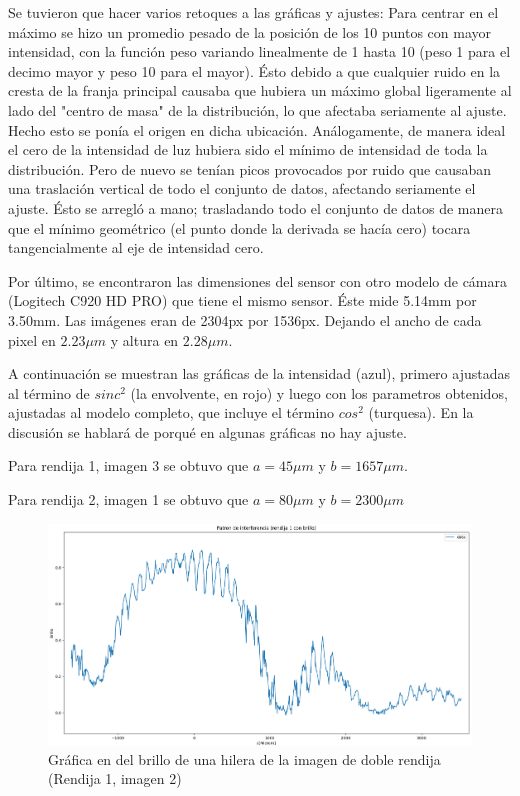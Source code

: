 \documentclass[12p]{article}
\begin{document}
Se tuvieron que hacer varios retoques a las gráficas y ajustes: Para centrar en el máximo se hizo un promedio pesado de la posición de los 10 puntos con mayor intensidad, con la función peso variando linealmente de 1 hasta 10 (peso 1 para el decimo mayor y peso 10 para el mayor). Ésto debido a que cualquier ruido en la cresta de la franja principal causaba que hubiera un máximo global ligeramente al lado del "centro de masa" de la distribución, lo que afectaba seriamente al ajuste. Hecho esto se ponía el origen en dicha ubicación. Análogamente, de manera ideal el cero de la intensidad de luz hubiera sido el mínimo de intensidad de toda la distribución. Pero de nuevo se tenían picos provocados por ruido que causaban una traslación vertical de todo el conjunto de datos, afectando seriamente el ajuste. Ésto se arregló a mano; trasladando todo el conjunto de datos de manera que el mínimo geométrico (el punto donde la derivada se hacía cero) tocara tangencialmente al eje de intensidad cero.

Por último, se encontraron las dimensiones del sensor con otro modelo de cámara (Logitech C920 HD PRO) que tiene el mismo sensor. Éste mide 5.14mm por 3.50mm. Las imágenes eran de 2304px por 1536px. Dejando el ancho de cada pixel en $2.23\mu m$ y altura en $2.28\mu m$.

A continuación se muestran las gráficas de la intensidad (azul), primero ajustadas al término de $sinc^2$ (la envolvente, en rojo) y luego con los parametros obtenidos, ajustadas al modelo completo, que incluye el término $cos^2$ (turquesa). En la discusión se hablará de porqué en algunas gráficas no hay ajuste.

Para rendija 1, imagen 3 se obtuvo que $a=45 \mu m$ y $b=1657 \mu m$.

Para rendija 2, imagen 1 se obtuvo que $a=80 \mu m$ y $b=2300 \mu m$

\begin{figure}[h]
  \includegraphics[width=1.0\textwidth]{2pg.png}
  \centering
  \caption{Gráfica en del brillo de una hilera de la imagen de doble rendija (Rendija 1, imagen 2)}
\end{figure}
\end{document}
